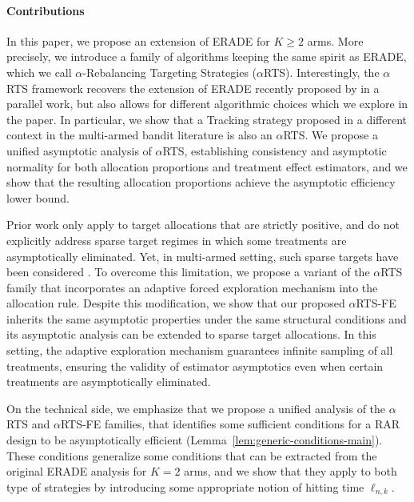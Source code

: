 \documentclass[11pt]{article}
\theoremstyle{plain}
\theoremstyle{definition}
\begin{document}
\paragraph*{Contributions} In this paper, we propose an extension of ERADE for $K\geq 2$ arms. More precisely, we introduce a family of algorithms keeping the same spirit as ERADE, which we call $\alpha$-Rebalancing Targeting Strategies ($\alpha$RTS). %
Interestingly, the $\alpha$RTS framework recovers the extension of ERADE recently proposed by \cite{alkhnefr2025efficient} in a parallel work, but also allows for different algorithmic choices which we explore in the paper. In particular, we show that a Tracking strategy proposed in a different context in the multi-armed bandit literature \citep{garivier2016optimal} is also an $\alpha$RTS. We propose a unified asymptotic analysis of $\alpha$RTS, establishing consistency and asymptotic normality for both allocation proportions and treatment effect estimators, and we show that the resulting allocation proportions achieve the asymptotic efficiency lower bound.

Prior work only apply to target allocations that are strictly positive, and do not explicitly address sparse target regimes in which some treatments are asymptotically eliminated. Yet, in multi-armed setting, such sparse targets have been considered \citep{tymofyeyev2007implementing}. To overcome this limitation, we propose a variant of the $\alpha$RTS family that incorporates an adaptive forced exploration mechanism into the allocation rule. Despite this modification, we show that our proposed $\alpha$RTS-FE inherits the same asymptotic properties  under the same structural conditions and its asymptotic analysis can be extended to sparse target allocations. In this setting, the adaptive exploration mechanism guarantees infinite sampling of all treatments, ensuring the validity of estimator asymptotics even when certain treatments are asymptotically eliminated.

On the technical side, we emphasize that we propose a unified analysis of the $\alpha$RTS and $\alpha$RTS-FE families, that identifies some sufficient conditions for a RAR design to be asymptotically efficient (Lemma~\ref{lem:generic-conditions-main}). These conditions generalize some conditions that can be  extracted from the original ERADE analysis for $K=2$ arms, and we show that they apply to both type of strategies by introducing some appropriate notion of hitting time $\ell_{n,k}$.
\end{document}
